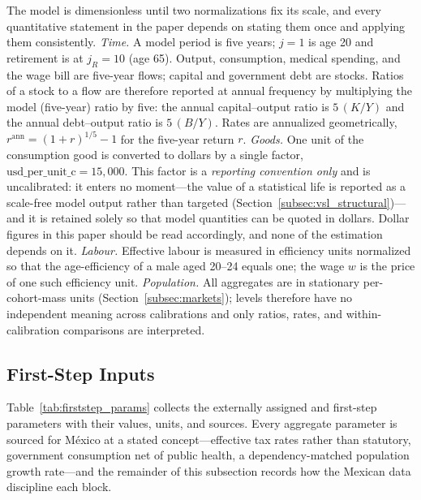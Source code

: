 \documentclass[12pt,a4paper]{article}
\begin{document}
The model is dimensionless until two normalizations fix its scale, and every quantitative statement in the paper depends on stating them once and applying them consistently. \emph{Time.} A model period is five years; $j=1$ is age 20 and retirement is at $j_R=10$ (age 65). Output, consumption, medical spending, and the wage bill are five-year flows; capital and government debt are stocks. Ratios of a stock to a flow are therefore reported at annual frequency by multiplying the model (five-year) ratio by five: the annual capital--output ratio is $5\,(K/Y)$ and the annual debt--output ratio is $5\,(B/Y)$. Rates are annualized geometrically, $r^{\mathrm{ann}}=(1+r)^{1/5}-1$ for the five-year return $r$. \emph{Goods.} One unit of the consumption good is converted to dollars by a single factor, $\text{usd\_per\_unit\_c}=15{,}000$. This factor is a \emph{reporting convention only} and is uncalibrated: it enters no moment---the value of a statistical life is reported as a scale-free model output rather than targeted (Section~\ref{subsec:vsl_structural})---and it is retained solely so that model quantities can be quoted in dollars. Dollar figures in this paper should be read accordingly, and none of the estimation depends on it. \emph{Labour.} Effective labour is measured in efficiency units normalized so that the age-efficiency of a male aged 20--24 equals one; the wage $w$ is the price of one such efficiency unit. \emph{Population.} All aggregates are in stationary per-cohort-mass units (Section~\ref{subsec:markets}); levels therefore have no independent meaning across calibrations and only ratios, rates, and within-calibration comparisons are interpreted.

\subsection{First-Step Inputs}
\label{sec:data}
\label{subsec:firststep}

Table~\ref{tab:firststep_params} collects the externally assigned and first-step parameters with their values, units, and sources. Every aggregate parameter is sourced for M\'exico at a stated concept---effective tax rates rather than statutory, government consumption net of public health, a dependency-matched population growth rate---and the remainder of this subsection records how the Mexican data discipline each block.
\end{document}
